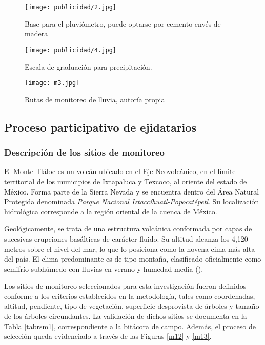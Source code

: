 \begin{figure}[h!]
\centering
  \texttt{[image: publicidad/2.jpg]}
  \caption{Base para el pluviómetro, puede optarse por cemento envés de madera}
  \label{publicidad2}
\end{figure}
\begin{figure}[h!]
\centering
  \texttt{[image: publicidad/4.jpg]}
  \caption{Escala de graduación para precipitación.}
		\label{publicidad4}
\end{figure}
\begin{figure}[h!]
\centering
  \texttt{[image: m3.jpg]}
  \caption{Rutas de monitoreo de lluvia, autoría propia}
  \label{m3}
\end{figure}



  \subsection{Proceso participativo de ejidatarios}
\subsubsection{Descripción de los sitios de monitoreo}

El Monte Tláloc es un volcán ubicado en el Eje Neovolcánico, en el límite territorial de los municipios de Ixtapaluca y Texcoco, al oriente del estado de México. Forma parte de la Sierra Nevada y se encuentra dentro del Área Natural Protegida denominada \textit{Parque Nacional Iztaccíhuatl-Popocatépetl}. Su localización hidrológica corresponde a la región oriental de la cuenca de México.

Geológicamente, se trata de una estructura volcánica conformada por capas de sucesivas erupciones basálticas de carácter fluido. Su altitud alcanza los 4,120 metros sobre el nivel del mar, lo que lo posiciona como la novena cima más alta del país. El clima predominante es de tipo montaña, clasificado oficialmente como semifrío subhúmedo con lluvias en verano y humedad media (\cite{inegi_texcoco}).

Los sitios de monitoreo seleccionados para esta investigación fueron definidos conforme a los criterios establecidos en la metodología, tales como coordenadas, altitud, pendiente, tipo de vegetación, superficie desprovista de árboles y tamaño de los árboles circundantes. La validación de dichos sitios se documenta en la Tabla \ref{tabrsm1}, correspondiente a la bitácora de campo. Además, el proceso de selección queda evidenciado a través de las Figuras \ref{m12} y \ref{m13}.


